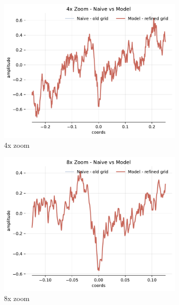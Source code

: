 \begin{figure}[h]
    \begin{subfigure}[b]{0.32\textwidth}
        \centering
        \includegraphics[width=\textwidth]{img/ch3/noise-4x-hf4096-w512.pdf}
        \caption{4x zoom}
    \end{subfigure}
    \begin{subfigure}[b]{0.32\textwidth}
        \centering
        \includegraphics[width=\textwidth]{img/ch3/noise-8x-hf4096-w512.pdf}
        \caption{8x zoom}
    \end{subfigure}
    \begin{subfigure}[b]{0.32\textwidth}
        \centering

\end{subfigure}
\end{figure}
